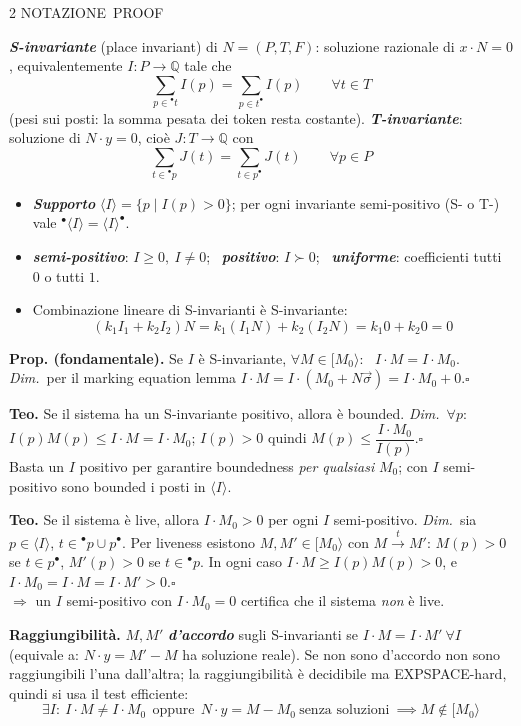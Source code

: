 \documentclass[8pt,a4paper]{extarticle}
\newcommand{\NOT}{\colorbox{black!12}{\scriptsize\textsf{NOTAZIONE}}}
\newcommand{\PRF}{\colorbox{pf!20}{\scriptsize\textsf{PROOF}}}
\newcommand{\topic}[2]{%
  \Needspace*{5\baselineskip}%
  \vspace{4pt}\noindent{\color{tit}\bfseries #1}\hfill #2\par
  \vspace{0pt}{\color{tit}\rule{\linewidth}{0.7pt}}\par\vspace{1.5pt}}
\newcommand{\D}[1]{\textbf{\textit{#1}}}
\newcommand{\pre}[1]{{}^{\bullet}#1}
\newcommand{\post}[1]{#1^{\bullet}}
\newcommand{\pf}{{\color{pf}\itshape Dim.}~}
\newcommand{\sq}{\hfill\ensuremath{\square}}
\begin{document}
\begin{multicols*}{2}
\topic{3. S-Invariants}{\NOT\ \PRF}
\D{S-invariante} (place invariant) di $N=(P,T,F)$: soluzione razionale di $x\cdot N=0$, equivalentemente $I:P\to\mathbb{Q}$ tale che
\[\sum_{p\in\pre{t}}I(p)=\sum_{p\in\post{t}}I(p)\qquad \forall t\in T\]
(pesi sui posti: la somma pesata dei token resta costante). \D{T-invariante}: soluzione di $N\cdot y=0$, cioè $J:T\to\mathbb{Q}$ con
\[\sum_{t\in\pre{p}}J(t)=\sum_{t\in\post{p}}J(t)\qquad \forall p\in P\]
\begin{itemize}
\item \D{Supporto} $\langle I\rangle=\{p\mid I(p)>0\}$; per ogni invariante semi-positivo (S- o T-) vale $\pre{\langle I\rangle}=\post{\langle I\rangle}$.
\item \D{semi-positivo}: $I\ge0,\ I\neq0$; \ \D{positivo}: $I\succ0$; \ \D{uniforme}: coefficienti tutti $0$ o tutti $1$.
\item Combinazione lineare di S-invarianti è S-invariante:
\[(k_1I_1+k_2I_2)N=k_1(I_1N)+k_2(I_2N)=k_1 0+k_2 0=0\]
\end{itemize}
\textbf{Prop. (fondamentale).} Se $I$ è S-invariante, $\forall M\in[M_0\rangle$: \ $I\cdot M=I\cdot M_0$.
\pf per il marking equation lemma $I\cdot M=I\cdot(M_0+N\vec{\sigma})=I\cdot M_0+0$.\sq

\textbf{Teo.} Se il sistema ha un S-invariante positivo, allora è bounded.
\pf $\forall p$: $I(p)M(p)\le I\cdot M=I\cdot M_0$; $I(p)>0$ quindi $M(p)\le \dfrac{I\cdot M_0}{I(p)}$.\sq\\
Basta un $I$ positivo per garantire boundedness \emph{per qualsiasi} $M_0$; con $I$ semi-positivo sono bounded i posti in $\langle I\rangle$.

\textbf{Teo.} Se il sistema è live, allora $I\cdot M_0>0$ per ogni $I$ semi-positivo.
\pf sia $p\in\langle I\rangle$, $t\in\pre{p}\cup\post{p}$. Per liveness esistono $M,M'\in[M_0\rangle$ con $M\xrightarrow{t}M'$: $M(p)>0$ se $t\in\post{p}$, $M'(p)>0$ se $t\in\pre{p}$. In ogni caso $I\cdot M\ge I(p)M(p)>0$, e $I\cdot M_0=I\cdot M=I\cdot M'>0$.\sq\\
$\Rightarrow$ un $I$ semi-positivo con $I\cdot M_0=0$ certifica che il sistema \emph{non} è live.

\textbf{Raggiungibilità.} $M,M'$ \D{d'accordo} sugli S-invarianti se $I\cdot M=I\cdot M'\ \forall I$ (equivale a: $N\cdot y=M'-M$ ha soluzione reale). Se non sono d'accordo non sono raggiungibili l'una dall'altra; la raggiungibilità è decidibile ma EXPSPACE-hard, quindi si usa il test efficiente:
\[\exists I:\ I\cdot M\neq I\cdot M_0\ \ \text{oppure}\ \ N\cdot y=M-M_0\ \text{senza soluzioni}\ \implies M\notin[M_0\rangle\]


\end{multicols*}
\end{document}
